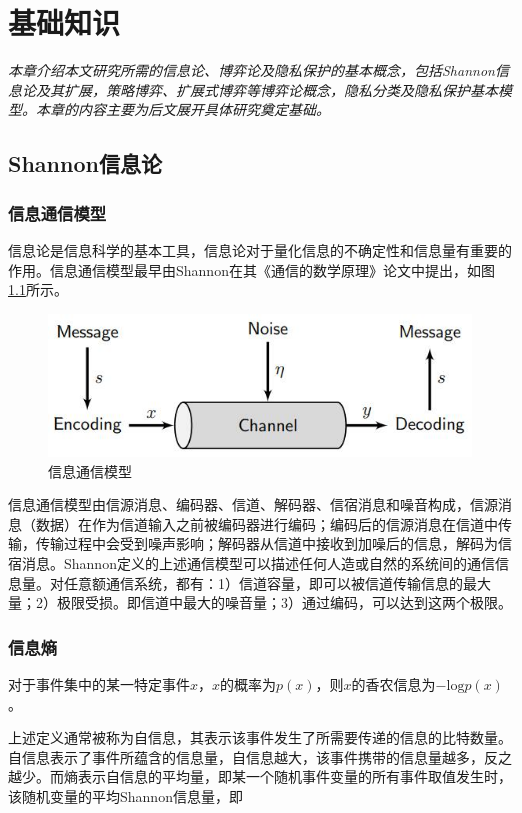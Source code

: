 \chapter{基础知识}
\label{chap:preliminary}

\textit{}

\textit{本章介绍本文研究所需的信息论、博弈论及隐私保护的基本概念，包括Shannon信息论及其扩展，策略博弈、扩展式博弈等博弈论概念，隐私分类及隐私保护基本模型。本章的内容主要为后文展开具体研究奠定基础。}
\section{Shannon信息论}

\subsection{信息通信模型}
信息论\cite{shannon1948mathematical,
	stone2018information}是信息科学的基本工具，信息论对于量化信息的不确定性和信息量有重要的作用。信息通信模型最早由Shannon在其《通信的数学原理》论文中提出，如图\ref{fig:communication-model}所示。

\begin{figure}[htbp]
	\centering
	\includegraphics[width = 0.6\linewidth]{./figures/shannon-communicaiton-model.jpg}
	\caption{信息通信模型\cite{stone2018information}
	}
	\label{fig:communication-model}
\end{figure}

信息通信模型\cite{stone2018information}由信源消息、编码器、信道、解码器、信宿消息和噪音构成，信源消息（数据）在作为信道输入之前被编码器进行编码；编码后的信源消息在信道中传输，传输过程中会受到噪声影响；解码器从信道中接收到加噪后的信息，解码为信宿消息。Shannon定义的上述通信模型可以描述任何人造或自然的系统间的通信信息量。对任意额通信系统，都有：1）信道容量，即可以被信道传输信息的最大量；2）极限受损。即信道中最大的噪音量；3）通过编码，可以达到这两个极限。



\subsection{信息熵}


\begin{definition}
	对于事件集中的某一特定事件$x$，$x$的概率为$p(x)$，则$x$的香农信息为$-\text{log}p(x)$。
\end{definition}
上述定义通常被称为自信息，其表示该事件发生了所需要传递的信息的比特数量。自信息表示了事件所蕴含的信息量，自信息越大，该事件携带的信息量越多，反之越少。而熵表示自信息的平均量，即某一个随机事件变量的所有事件取值发生时，该随机变量的平均Shannon信息量，即

